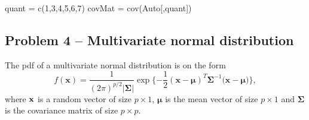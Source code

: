 \documentclass[
]{article}
\newenvironment{Shaded}{\begin{snugshade}}{\end{snugshade}}
\newcommand{\DecValTok}[1]{\textcolor[rgb]{0.00,0.00,0.81}{#1}}
\newcommand{\FunctionTok}[1]{\textcolor[rgb]{0.00,0.00,0.00}{#1}}
\newcommand{\NormalTok}[1]{#1}
\newcommand{\OtherTok}[1]{\textcolor[rgb]{0.56,0.35,0.01}{#1}}
\begin{document}
\begin{Shaded}
\begin{Highlighting}[]
\NormalTok{quant }\OtherTok{=} \FunctionTok{c}\NormalTok{(}\DecValTok{1}\NormalTok{,}\DecValTok{3}\NormalTok{,}\DecValTok{4}\NormalTok{,}\DecValTok{5}\NormalTok{,}\DecValTok{6}\NormalTok{,}\DecValTok{7}\NormalTok{)}
\NormalTok{covMat }\OtherTok{=} \FunctionTok{cov}\NormalTok{(Auto[,quant])}
\end{Highlighting}
\end{Shaded}

\hypertarget{problem-4-multivariate-normal-distribution}{%
\subsection{Problem 4 -- Multivariate normal
distribution}\label{problem-4-multivariate-normal-distribution}}

The pdf of a multivariate normal distribution is on the form
\[ f(\boldsymbol{x}) = \frac{1}{(2\pi)^{p/2}|\boldsymbol{\Sigma|}} \exp\{-\frac{1}{2}(\boldsymbol{x-\mu})^T\boldsymbol{\Sigma}^{-1}(\boldsymbol{x-\mu)}\},\]
where \(\bf{x}\) is a random vector of size \(p\times 1\),
\(\boldsymbol{\mu}\) is the mean vector of size \(p\times 1\) and
\(\boldsymbol{\Sigma}\) is the covariance matrix of size \(p\times p\).
\end{document}
